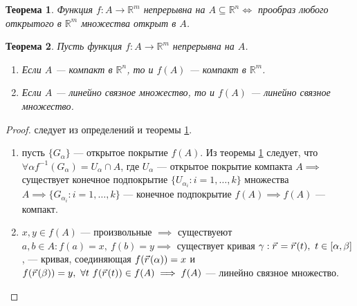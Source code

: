 \documentclass[12pt]{report}
\numberwithin{equation}{section}
\newtheorem{theorem}{Теорема}[section]
\newcommand{\pvec}[1]{\vec{#1}\mkern2mu\vphantom{#1}}
\begin{document}
\begin{theorem} \label{th:34:1}
Функция $f : A \to \mathbb{R}^m$ непрерывна на $A \subseteq \mathbb{R}^n \iff$ прообраз любого открытого в $\mathbb{R}^m$ множества открыт в $A$.
\end{theorem}

\begin{theorem} \label{th:34:2}
Пусть функция $f : A \to \mathbb{R}^m$ непрерывна на $A$.
\begin{enumerate}
\item[а)] Если $A$ --- компакт в $\mathbb{R}^n$, то и $f(A)$ --- компакт в $\mathbb{R}^m$.
\item[б)] Если $A$ --- линейно связное множество, то и $f(A)$ --- линейно связное множество.
\end{enumerate}
\end{theorem}
\begin{proof}
следует из определений и теоремы \ref{th:34:1}.
\begin{enumerate}
\item[а):] пусть $\{ G_{\alpha} \}$ --- открытое покрытие $f(A)$. Из теоремы \ref{th:34:1} следует, что $\forall \alpha f^{-1} (G_{\alpha}) = U_{\alpha} \cap A$, где $U_{\alpha}$ --- открытое покрытие компакта $A \implies$ существует конечное подпокрытие $\{ U_{\alpha_i} : i = 1,\ldots, k\}$ множества $A \implies \{ G_{\alpha_i} : i = 1, \ldots, k\}$ --- конечное подпокрытие $f(A) \implies f(A)$ --- компакт.
\item[б):] $x,y \in f(A)$ --- произвольные $\implies$ существуеют $a,b \in A : f(a) = x,~ f(b) = y \implies$ существует кривая $\gamma : \pvec{r} = \pvec{r}(t),~t \in [\alpha, \beta]$, --- кривая, соединяющая $f(\pvec{r}(\alpha)) = x$ и $f(\pvec{r}(\beta)) = y,~\forall t~f(\pvec{r}(t)) \in f(A) \implies f(A)$ --- линейно связное множество.
\end{enumerate}
\end{proof}
\end{document}

